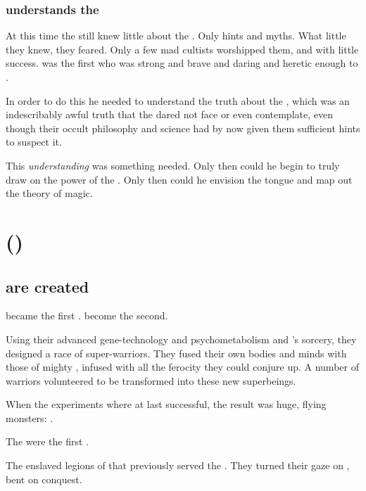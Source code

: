 \subsubsection{\Sethicus understands the \xss}
At this time the \ophidians still knew little about the \xss. 
Only hints and myths.
What little they knew, they feared.
Only a few mad cultists worshipped them, and with little success.
\Sethicus was the first who was strong and brave and daring and heretic enough to . 

In order to do this he needed to understand the truth about the , which was an indescribably awful truth that the \ophidians dared not face or even contemplate, even though their occult philosophy and science had by now given them sufficient hints to suspect it. 

This \emph{understanding} was something \Sethicus needed.
Only then could he begin to truly draw on the power of the \xss.
Only then could he envision the \TrueDraconic tongue and map out the \draconic theory of magic.







\section{\Sethicus ()}
\subsection{\Dragons are created}
\Sethicus became the first \dragon.
\Tiamat become the second.

Using their advanced gene-technology and psychometabolism and \Sethicus's \xsic{} sorcery, they designed a race of \ophidian{} super-warriors. 
They fused their own \ophidian bodies and minds with those of mighty , infused with all the \xsic{} ferocity they could conjure up. 
A number of \ophidian{} warriors volunteered to be transformed into these new superbeings. 

When the experiments where at last successful, the result was huge, flying monsters: 
\Dragons. 

The \dragons were the first . 

The \dragons{} enslaved legions of \daemons{} that previously served the \xzaishanns. 
They turned their gaze on \Miith{}, bent on conquest.

